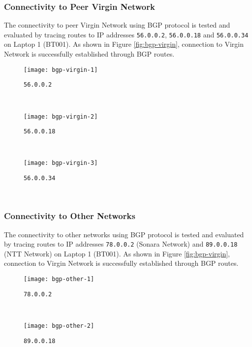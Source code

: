 \clearpage

\subsubsection{Connectivity to Peer Virgin Network}
The connectivity to peer Virgin Network using BGP protocol is tested and evaluated by tracing routes to IP addresses \texttt{56.0.0.2}, \texttt{56.0.0.18} and \texttt{56.0.0.34} on Laptop 1 (BT001). As shown in Figure \ref{fig:bgp-virgin}, connection to Virgin Network is successfully established through BGP routes.

\begin{figure*}[ht!]
    \centering
    \begin{subfigure}[b]{\textwidth}
        \centering
        \texttt{[image: bgp-virgin-1]}
        \caption{\texttt{56.0.0.2}}
    \end{subfigure}
    ~
    \begin{subfigure}[b]{\textwidth}
        \centering
        \texttt{[image: bgp-virgin-2]}
        \caption{\texttt{56.0.0.18}}
    \end{subfigure}
    ~
    \begin{subfigure}[b]{\textwidth}
        \centering
        \texttt{[image: bgp-virgin-3]}
        \caption{\texttt{56.0.0.34}}
    \end{subfigure}
    ~
    \caption{Tracing IPv4 Routes to Virgin Network on Laptop 1 (BT001) using \texttt{traceroute}.}
    \label{fig:bgp-virgin}
\end{figure*}



\clearpage


\subsubsection{Connectivity to Other Networks}
The connectivity to other networks using BGP protocol is tested and evaluated by tracing routes to IP addresses \texttt{78.0.0.2} (Sonara Network) and \texttt{89.0.0.18} (NTT Network) on Laptop 1 (BT001). As shown in Figure \ref{fig:bgp-virgin}, connection to Virgin Network is successfully established through BGP routes.

\begin{figure*}[ht!]
    \centering
    \begin{subfigure}[b]{\textwidth}
        \centering
        \texttt{[image: bgp-other-1]}
        \caption{\texttt{78.0.0.2}}
    \end{subfigure}
    ~
    \begin{subfigure}[b]{\textwidth}
        \centering
        \texttt{[image: bgp-other-2]}
        \caption{\texttt{89.0.0.18}}
    \end{subfigure}
    \caption{Tracing IPv4 Routes to Other Networks on Laptop 1 (BT001) using \texttt{traceroute}.}
    \label{fig:bgp-virgin}
\end{figure*}



